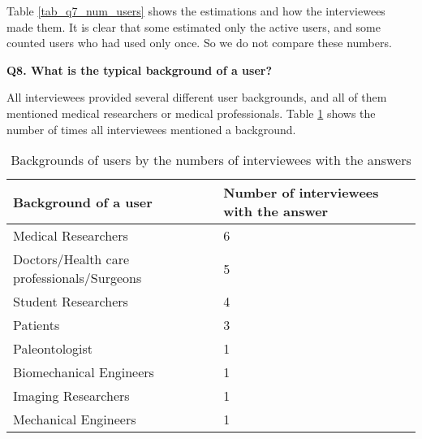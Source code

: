 Table \ref{tab_q7_num_users} shows the estimations and how the interviewees made them. It is clear that some estimated only the active users, and some counted users who had used only once. So we do not compare these numbers.

\noindent\textbf{Q8. What is the typical background of a user?}

All interviewees provided several different user backgrounds, and all of them mentioned medical researchers or medical professionals. Table \ref{tab_q8_user_backgrounds} shows the number of times all interviewees mentioned a background.

\begin{table}[H]
\centering
\begin{tabular}{ll}
\hline
Background of a user & Number of interviewees with the answer \\ \hline
Medical Researchers & 6 \\
Doctors/Health care professionals/Surgeons & 5 \\
Student Researchers & 4 \\
Patients & 3 \\
Paleontologist & 1 \\
Biomechanical Engineers & 1 \\
Imaging Researchers & 1 \\
Mechanical Engineers & 1 \\ \hline
\end{tabular}
\caption{\label{tab_q8_user_backgrounds}Backgrounds of users by the numbers of interviewees with the answers}
\end{table}
